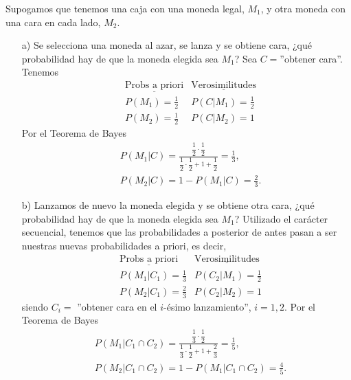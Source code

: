 \begin{ejemplo}
    Supogamos que tenemos una caja con una moneda legal, $M_1$, y otra moneda con una cara en cada lado, $M_2$.
    \begin{enumerate}
        \item[a)] Se selecciona una moneda al azar, se lanza y se obtiene cara, ¿qué probabilidad hay de que la moneda elegida sea $M_1$? Sea $C=$''obtener cara''. Tenemos
              \begin{align*}
                   & \underline{\text{Probs a priori}} & \underline{\text{Verosimilitudes}} \\
                   & P(M_1) = \frac{1}{2}              & P(C | M_1) = \frac{1}{2}           \\
                   & P(M_2) = \frac{1}{2}              & P(C | M_2) = 1
              \end{align*}
              Por el Teorema de Bayes
              \begin{align*}
                   & P(M_1 | C) = \frac{\dfrac{1}{2} \cdot \dfrac{1}{2}}{\dfrac{1}{2} \cdot \dfrac{1}{2} + 1 + \dfrac{1}{2}} = \frac{1}{3}, \\
                   & P(M_2 | C) = 1 - P(M_1 | C) = \frac{2}{3}.
              \end{align*}
        \item[b)] Lanzamos de nuevo la moneda elegida y se obtiene otra cara, ¿qué probabilidad hay de que la moneda elegida sea $M_1$? Utilizado el carácter secuencial, tenemos que las probabilidades a posterior de antes pasan a ser nuestras nuevas probabilidades a priori, es decir,
              \begin{align*}
                   & \underline{\text{Probs a priori}} & \underline{\text{Verosimilitudes}} \\
                   & P(M_1|C_1) = \frac{1}{3}          & P(C_2 | M_1) = \frac{1}{2}         \\
                   & P(M_2|C_1) = \frac{2}{3}          & P(C_2 | M_2) = 1
              \end{align*}
              siendo $C_i =$ ''obtener cara en el $i$-ésimo lanzamiento'', $i=1,2$. Por el Teorema de Bayes
              \begin{align*}
                   & P(M_1 | C_1 \cap C_2) = \frac{\dfrac{1}{3} \cdot \dfrac{1}{2}}{\dfrac{1}{3} \cdot \dfrac{1}{2} + 1 + \dfrac{2}{3}} = \frac{1}{5}, \\
                   & P(M_2 | C_1 \cap C_2) = 1 - P(M_1 | C_1 \cap C_2) = \frac{4}{5}.
              \end{align*}
    \end{enumerate}
\end{ejemplo}

